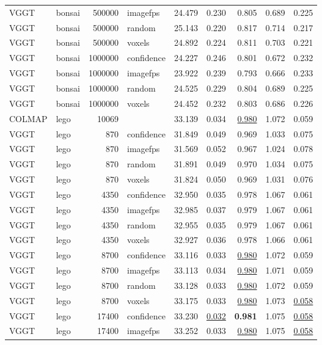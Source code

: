 \begin{table}[H]
\begin{tabular}{llrlrrrrr}
VGGT & bonsai & 500000 & imagefps & 24.479 & 0.230 & 0.805 & 0.689 & 0.225 \\
VGGT & bonsai & 500000 & random & 25.143 & 0.220 & 0.817 & 0.714 & 0.217 \\
VGGT & bonsai & 500000 & voxels & 24.892 & 0.224 & 0.811 & 0.703 & 0.221 \\
VGGT & bonsai & 1000000 & confidence & 24.227 & 0.246 & 0.801 & 0.672 & 0.232 \\
VGGT & bonsai & 1000000 & imagefps & 23.922 & 0.239 & 0.793 & 0.666 & 0.233 \\
VGGT & bonsai & 1000000 & random & 24.525 & 0.229 & 0.804 & 0.689 & 0.225 \\
VGGT & bonsai & 1000000 & voxels & 24.452 & 0.232 & 0.803 & 0.686 & 0.226 \\
\midrule
COLMAP & lego & 10069 &  & 33.139 & 0.034 & \underline{0.980} & 1.072 & 0.059 \\
VGGT & lego & 870 & confidence & 31.849 & 0.049 & 0.969 & 1.033 & 0.075 \\
VGGT & lego & 870 & imagefps & 31.569 & 0.052 & 0.967 & 1.024 & 0.078 \\
VGGT & lego & 870 & random & 31.891 & 0.049 & 0.970 & 1.034 & 0.075 \\
VGGT & lego & 870 & voxels & 31.824 & 0.050 & 0.969 & 1.031 & 0.076 \\
VGGT & lego & 4350 & confidence & 32.950 & 0.035 & 0.978 & 1.067 & 0.061 \\
VGGT & lego & 4350 & imagefps & 32.985 & 0.037 & 0.979 & 1.067 & 0.061 \\
VGGT & lego & 4350 & random & 32.955 & 0.035 & 0.979 & 1.067 & 0.061 \\
VGGT & lego & 4350 & voxels & 32.927 & 0.036 & 0.978 & 1.066 & 0.061 \\
VGGT & lego & 8700 & confidence & 33.116 & 0.033 & \underline{0.980} & 1.072 & 0.059 \\
VGGT & lego & 8700 & imagefps & 33.113 & 0.034 & \underline{0.980} & 1.071 & 0.059 \\
VGGT & lego & 8700 & random & 33.128 & 0.033 & \underline{0.980} & 1.072 & 0.059 \\
VGGT & lego & 8700 & voxels & 33.175 & 0.033 & \underline{0.980} & 1.073 & \underline{0.058} \\
VGGT & lego & 17400 & confidence & 33.230 & \underline{0.032} & \textbf{0.981} & 1.075 & \underline{0.058} \\
VGGT & lego & 17400 & imagefps & 33.252 & 0.033 & \underline{0.980} & 1.075 & \underline{0.058} \\

\end{tabular}
\end{table}
